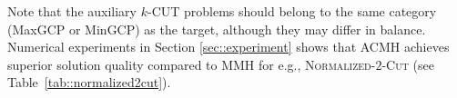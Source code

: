 \documentclass[12pt, a4paper]{article}%
\DeclareMathOperator*{\opt}{\ensuremath{opt}}
\numberwithin{equation}{section}
\theoremstyle{plain}
\begin{document}
			Note that the auxiliary $k$-CUT problems should belong to the same category (MaxGCP or MinGCP) as the target, although they may differ in balance. Numerical experiments in Section \ref{sec::experiment} shows that
			ACMH achieves superior solution quality compared to MMH for e.g., \textsc{Normalized}-$2$-\textsc{Cut} (see Table~\ref{tab::normalized2cut}).
			
			
\end{document}
